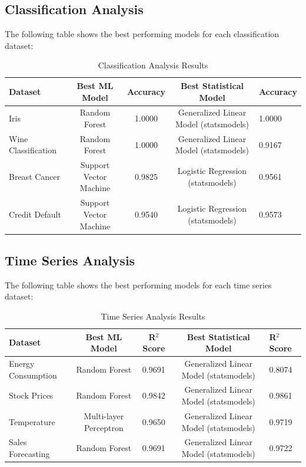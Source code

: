 \documentclass[11pt,a4paper]{article}
\begin{document}
\subsection{Classification Analysis}

The following table shows the best performing models for each classification dataset:

\begin{table}[h!]
\centering
\begin{tabular}{lccc}
\toprule
Dataset & Best ML Model & Accuracy & Best Statistical Model & Accuracy \\
\midrule
Iris & Random Forest & 1.0000 & Generalized Linear Model (statsmodels) & 1.0000 \\
Wine Classification & Random Forest & 1.0000 & Generalized Linear Model (statsmodels) & 0.9167 \\
Breast Cancer & Support Vector Machine & 0.9825 & Logistic Regression (statsmodels) & 0.9561 \\
Credit Default & Support Vector Machine & 0.9540 & Logistic Regression (statsmodels) & 0.9573 \\
\bottomrule
\end{tabular}
\caption{Classification Analysis Results}
\end{table}

\subsection{Time Series Analysis}

The following table shows the best performing models for each time series dataset:

\begin{table}[h!]
\centering
\begin{tabular}{lccc}
\toprule
Dataset & Best ML Model & R$^2$ Score & Best Statistical Model & R$^2$ Score \\
\midrule
Energy Consumption & Random Forest & 0.9691 & Generalized Linear Model (statsmodels) & 0.8074 \\
Stock Prices & Random Forest & 0.9842 & Generalized Linear Model (statsmodels) & 0.9861 \\
Temperature & Multi-layer Perceptron & 0.9650 & Generalized Linear Model (statsmodels) & 0.9719 \\
Sales Forecasting & Random Forest & 0.9691 & Generalized Linear Model (statsmodels) & 0.9722 \\
\bottomrule
\end{tabular}
\caption{Time Series Analysis Results}
\end{table}
\end{document}
